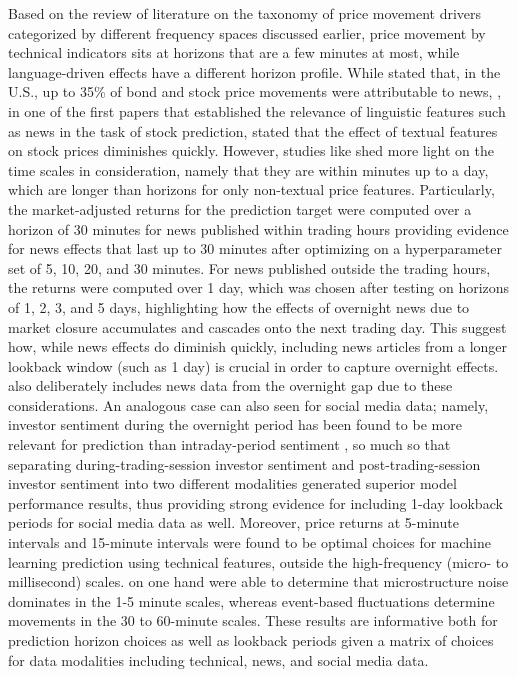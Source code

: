 \documentclass[stu,floatsintext]{apa7}
\begin{document}
Based on the review of literature on the taxonomy of price movement drivers categorized by different frequency spaces discussed earlier, price movement by technical indicators sits at horizons that are a few minutes at most, while language-driven effects have a different horizon profile. While \textcite{kerssenfischer2024what} stated that, in the U.S., up to 35\% of bond and stock price movements were attributable to news, \textcite{lee2014importance}, in one of the first papers that established the relevance of linguistic features such as news in the task of stock prediction, stated that the effect of textual features on stock prices diminishes quickly. However, studies like \textcite{chen2021stock} shed more light on the time scales in consideration, namely that they are within minutes up to a day, which are longer than horizons for only non-textual price features. Particularly, the market-adjusted returns for the prediction target were computed over a horizon of 30 minutes for news published within trading hours providing evidence for news effects that last up to 30 minutes after optimizing on a hyperparameter set of 5, 10, 20, and 30 minutes. For news published outside the trading hours, the returns were computed over 1 day, which was chosen after testing on horizons of 1, 2, 3, and 5 days, highlighting how the effects of overnight news due to market closure accumulates and cascades onto the next trading day. This suggest how, while news effects do diminish quickly, including news articles from a longer lookback window (such as 1 day) is crucial in order to capture overnight effects. \textcite{sun2026intelligent} also deliberately includes news data from the overnight gap due to these considerations. An analogous case can also seen for social media data; namely, investor sentiment during the overnight period has been found to be more relevant for prediction than intraday-period sentiment \parencite{sun2025intraday}, so much so that separating during-trading-session investor sentiment and post-trading-session investor sentiment into two different modalities generated superior model performance results, thus providing strong evidence for including 1-day lookback periods for social media data as well. Moreover, price returns at 5-minute intervals \parencite{huddleston2021intraday} and 15-minute intervals \parencite{khan2023performance,moberg2007stock} were found to be optimal choices for machine learning prediction using technical features, outside the high-frequency (micro- to millisecond) scales. \textcite{vogel2025transformerbased} on one hand were able to determine that microstructure noise dominates in the 1-5 minute scales, whereas event-based fluctuations determine movements in the 30 to 60-minute scales. These results are informative both for prediction horizon choices as well as lookback periods given a matrix of choices for data modalities including technical, news, and social media data.
\end{document}

